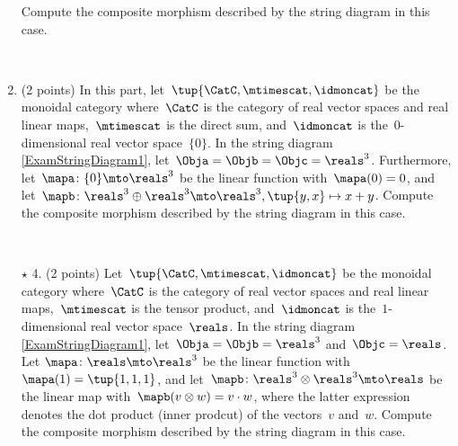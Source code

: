 \documentclass[paper=8.125in:10.250in,pagesize=pdftex,
    headinclude=false,footinclude=false,oneside,egregdoesnotlikesansseriftitles]{kaobook}
\begin{document}
\begin{gradedexercise}
\begin{enumerate}
Compute the composite morphism described by the string diagram in this case.

\

\item (2 points) In this part, let~$\tup{\CatC,\mtimescat,\idmoncat}$ be the monoidal category where~$\CatC$ is the category of real vector spaces and real linear maps,~$\mtimescat$ is the direct sum, and~$\idmoncat$ is the~$0$-dimensional real vector space~$\{ 0 \}$.
In the string diagram \cref{ExamStringDiagram1}, let~$\Obja = \Objb = \Objc = \reals^3$.
Furthermore, let~$\mapa\colon \{ 0 \} \mto \reals^3$ be the linear function with~$\mapa(0) = 0$, and let~$\mapb \colon \reals^3 \oplus \reals^3 \mto \reals^3, \tup{y, x} \mapsto x + y$.
Compute the composite morphism described by the string diagram in this case.

\

\item[$\star$ 4.] (2 points) Let~$\tup{\CatC,\mtimescat,\idmoncat}$ be the monoidal category where~$\CatC$ is the category of real vector spaces and real linear maps,~$\mtimescat$ is the tensor product, and~$\idmoncat$ is the~$1$-dimensional real vector space~$\reals$.
In the string diagram \cref{ExamStringDiagram1}, let~$\Obja = \Objb =  \reals^3$ and~$\Objc = \reals$.
Let $\mapa\colon \reals \mto \reals^3$ be the linear function with~$\mapa(1) = \tup{1,1,1}$, and let~$\mapb \colon \reals^3 \otimes \reals^3 \mto \reals$ be the linear map with~$\mapb (v \otimes w) = v\cdot w$, where the latter expression denotes the dot product (inner prodcut) of the vectors~$v$ and~$w$.
Compute the composite morphism described by the string diagram in this case.
\end{enumerate}
\end{gradedexercise}


\newpage
\end{document}
